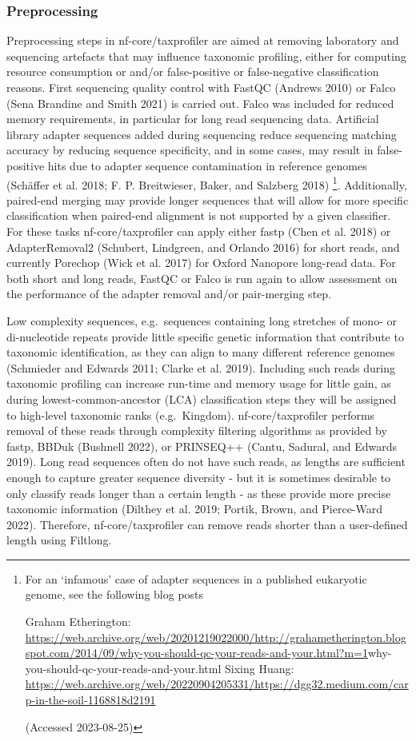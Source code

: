 \documentclass[
]{article}
\begin{document}
\hypertarget{preprocessing}{%
\subsubsection{Preprocessing}\label{preprocessing}}

Preprocessing steps in nf-core/taxprofiler are aimed at removing
laboratory and sequencing artefacts that may influence taxonomic
profiling, either for computing resource consumption or and/or
false-positive or false-negative classification reasons. First
sequencing quality control with FastQC (Andrews 2010) or Falco (Sena
Brandine and Smith 2021) is carried out. Falco was included for reduced
memory requirements, in particular for long read sequencing data.
Artificial library adapter sequences added during sequencing reduce
sequencing matching accuracy by reducing sequence specificity, and in
some cases, may result in false-positive hits due to adapter sequence
contamination in reference genomes (Schäffer et al. 2018; F. P.
Breitwieser, Baker, and Salzberg 2018) \footnote{For an `infamous' case
  of adapter sequences in a published eukaryotic genome, see the
  following blog posts

  Graham Etherington:
  \url{https://web.archive.org/web/20201219022000/http://grahametherington.blogspot.com/2014/09/why-you-should-qc-your-reads-and-your.html?m=1}why-you-should-qc-your-reads-and-your.html
  Sixing Huang:
  \url{https://web.archive.org/web/20220904205331/https://dgg32.medium.com/carp-in-the-soil-1168818d2191}

  (Accessed 2023-08-25)}. Additionally, paired-end merging may provide
longer sequences that will allow for more specific classification when
paired-end alignment is not supported by a given classifier. For these
tasks nf-core/taxprofiler can apply either fastp (Chen et al. 2018) or
AdapterRemoval2 (Schubert, Lindgreen, and Orlando 2016) for short reads,
and currently Porechop (Wick et al. 2017) for Oxford Nanopore long-read
data. For both short and long reads, FastQC or Falco is run again to
allow assessment on the performance of the adapter removal and/or
pair-merging step.

Low complexity sequences, e.g.~sequences containing long stretches of
mono- or di-nucleotide repeats provide little specific genetic
information that contribute to taxonomic identification, as they can
align to many different reference genomes (Schmieder and Edwards 2011;
Clarke et al. 2019). Including such reads during taxonomic profiling can
increase run-time and memory usage for little gain, as during
lowest-common-ancestor (LCA) classification steps they will be assigned
to high-level taxonomic ranks (e.g.~Kingdom). nf-core/taxprofiler
performs removal of these reads through complexity filtering algorithms
as provided by fastp, BBDuk (Bushnell 2022), or PRINSEQ++ (Cantu,
Sadural, and Edwards 2019). Long read sequences often do not have such
reads, as lengths are sufficient enough to capture greater sequence
diversity - but it is sometimes desirable to only classify reads longer
than a certain length - as these provide more precise taxonomic
information (Dilthey et al. 2019; Portik, Brown, and Pierce-Ward 2022).
Therefore, nf-core/taxprofiler can remove reads shorter than a
user-defined length using Filtlong.
\end{document}
